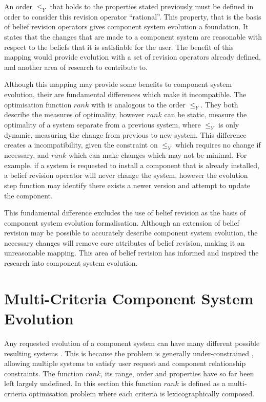 An order $\leq_{Y}$ that holds to the properties stated previously must be defined in order to consider this revision operator ``rational''.
This property, that is the basis of belief revision operators gives component system evolution a foundation.
It states that the changes that are made to a component system are reasonable with respect to the beliefs that it is satisfiable for the user.
The benefit of this mapping would provide evolution with a set of revision operators already defined, and another area of research to contribute to.

Although this mapping may provide some benefits to component system evolution, their are fundamental differences which make it incompatible.
The optimisation function $rank$ with is analogous to the order $\leq_{Y}$.
They both describe the measures of optimality, however $rank$ can be static, measure the optimality of a system separate from a previous system,
where $\leq_Y$ is only dynamic, measuring the change from previous to new system.
This difference creates a incompatibility, given the constraint on $\leq_Y$ which requires no change if necessary,
and $rank$ which can make changes which may not be minimal.
For example, if a system is requested to install a component that is already installed, a belief revision operator will never change the system,
however the evolution step function may identify there exists a newer version and attempt to update the component.

This fundamental difference excludes the use of belief revision as the basis of component system evolution formalisation.
Although an extension of belief revision may be possible to accurately describe component system evolution, 
the necessary changes will remove core attributes of belief revision, making it an unreasonable mapping.
This area of belief revision has informed and inspired the research into component system evolution.

\section{Multi-Criteria Component System Evolution}
\label{formal.opt}
Any requested evolution of a component system can have many different possible resulting systems \citep{leBerre2010}.
This is because the problem is generally under-constrained \citep{Berre2008}, allowing multiple systems to satisfy user request and component relationship constraints.
The function $rank$, its range, order and properties have so far been left largely undefined. 
In this section this function $rank$ is defined as a multi-criteria optimisation problem where each criteria is lexicographically composed.

